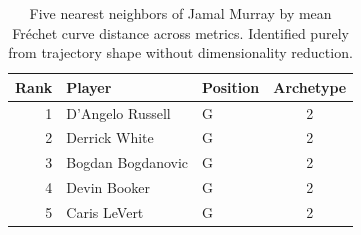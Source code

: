 \begin{table}[htbp]
  \centering\small
  \begin{tabular}{rllc}
    \toprule
    Rank & Player & Position & Archetype \\
    \midrule
    1 & D'Angelo Russell & G & 2 \\
    2 & Derrick White & G & 2 \\
    3 & Bogdan Bogdanovic & G & 2 \\
    4 & Devin Booker & G & 2 \\
    5 & Caris LeVert & G & 2 \\
    \bottomrule
  \end{tabular}
  \caption{Five nearest neighbors of Jamal Murray by mean Fr\'{e}chet curve distance across metrics. Identified purely from trajectory shape without dimensionality reduction.}
  \label{tab:Jamal_Murray_frechet_curve_neighbors}
\end{table}

